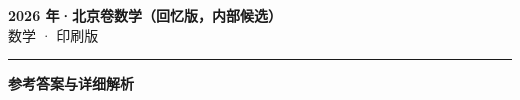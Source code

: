 \documentclass[zihao=5, a4paper]{ctexart}
\begin{document}
\begin{center}
  {\Large\bfseries 2026 年·北京卷数学（回忆版，内部候选）}\\[4pt]
  {\large 数学 · 印刷版}
\end{center}
\medskip
{}

\par\bigskip\hrule\bigskip
{}
\begin{center}{\large\bfseries 参考答案与详细解析}\end{center}
\smallskip

\end{document}
